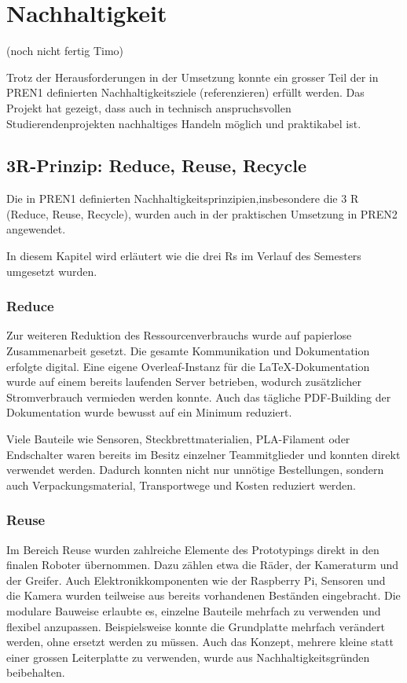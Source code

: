 \section{Nachhaltigkeit}
(noch nicht fertig Timo)

Trotz der Herausforderungen in der Umsetzung konnte ein grosser Teil der in PREN1  definierten Nachhaltigkeitsziele (referenzieren) erfüllt werden. Das Projekt hat gezeigt, dass auch in technisch anspruchsvollen Studierendenprojekten nachhaltiges Handeln möglich und praktikabel ist.

\subsection{3R-Prinzip: Reduce, Reuse, Recycle}
Die in PREN1 definierten Nachhaltigkeitsprinzipien,insbesondere die 3 R (Reduce, Reuse, Recycle), wurden auch in der praktischen Umsetzung in PREN2 angewendet.  

 In diesem Kapitel wird erläutert wie die drei Rs im Verlauf des Semesters umgesetzt wurden.

\subsubsection{Reduce}

Zur weiteren Reduktion des Ressourcenverbrauchs wurde auf papierlose Zusammenarbeit gesetzt. Die gesamte Kommunikation und Dokumentation erfolgte digital. Eine eigene Overleaf-Instanz für die LaTeX-Dokumentation wurde auf einem bereits laufenden Server betrieben, wodurch zusätzlicher Stromverbrauch vermieden werden konnte. Auch das tägliche PDF-Building der Dokumentation wurde bewusst auf ein Minimum reduziert.

Viele Bauteile wie Sensoren, Steckbrettmaterialien, PLA-Filament oder Endschalter waren bereits im Besitz einzelner Teammitglieder und konnten direkt verwendet werden. Dadurch konnten nicht nur unnötige Bestellungen, sondern auch Verpackungsmaterial, Transportwege und Kosten reduziert werden.


\subsubsection{Reuse}

Im Bereich Reuse wurden zahlreiche Elemente des Prototypings direkt in den finalen Roboter übernommen. Dazu zählen etwa die Räder, der Kameraturm und der Greifer. Auch Elektronikkomponenten wie der Raspberry Pi, Sensoren und die Kamera wurden teilweise aus bereits vorhandenen Beständen eingebracht. Die modulare Bauweise erlaubte es, einzelne Bauteile mehrfach zu verwenden und flexibel anzupassen. Beispielsweise konnte die Grundplatte mehrfach verändert werden, ohne ersetzt werden zu müssen. Auch das Konzept, mehrere kleine statt einer grossen Leiterplatte zu verwenden, wurde aus Nachhaltigkeitsgründen beibehalten.



